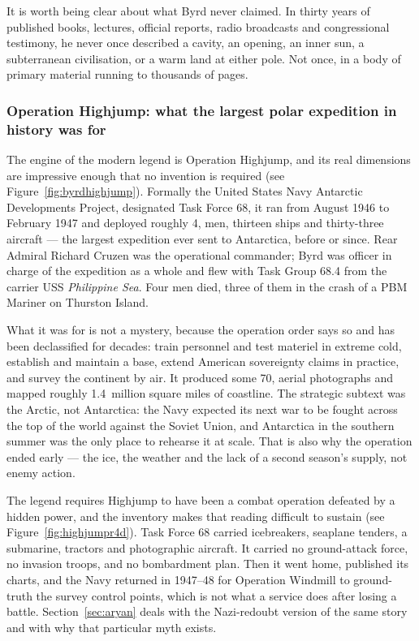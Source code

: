 It is worth being clear about what Byrd never claimed. In thirty years of published books,
lectures, official reports, radio broadcasts and congressional testimony, he never once described a
cavity, an opening, an inner sun, a subterranean civilisation, or a warm land at either pole. Not
once, in a body of primary material running to thousands of pages.

\Needspace*{0.40\textheight}
\subsubsection*{Operation Highjump: what the largest polar expedition in history was for}

The engine of the modern legend is Operation Highjump, and its real dimensions are impressive enough
that no invention is required (see Figure~\ref{fig:byrdhighjump}). Formally the United States Navy
Antarctic Developments Project, designated Task Force 68, it ran from August 1946 to February 1947
and deployed roughly 4, men, thirteen ships and thirty-three aircraft --- the largest expedition
ever sent to Antarctica, before or since. Rear Admiral Richard Cruzen was the operational commander;
Byrd was officer in charge of the expedition as a whole and flew with Task Group 68.4 from the
carrier USS \emph{Philippine Sea}. Four men died, three of them in the crash of a PBM Mariner on
Thurston Island.

What it was for is not a mystery, because the operation order says so and has been declassified for
decades: train personnel and test materiel in extreme cold, establish and maintain a base, extend
American sovereignty claims in practice, and survey the continent by air. It produced some
70, aerial photographs and mapped roughly 1.4~million square miles of coastline. The strategic
subtext was the Arctic, not Antarctica: the Navy expected its next war to be fought across the top
of the world against the Soviet Union, and Antarctica in the southern summer was the only place to
rehearse it at scale. That is also why the operation ended early --- the ice, the weather and the
lack of a second season's supply, not enemy action.

The legend requires Highjump to have been a combat operation defeated by a hidden power, and the
inventory makes that reading difficult to sustain (see Figure~\ref{fig:highjumpr4d}). Task Force 68
carried icebreakers, seaplane tenders, a submarine, tractors and photographic aircraft. It carried
no ground-attack force, no invasion troops, and no bombardment plan. Then it went home, published
its charts, and the Navy returned in 1947--48 for Operation Windmill to ground-truth the survey
control points, which is not what a service does after losing a battle. Section~\ref{sec:aryan}
deals with the Nazi-redoubt version of the same story and with why that particular myth exists.

